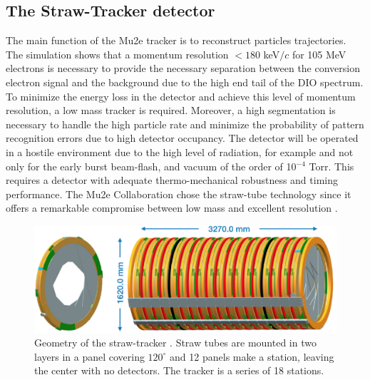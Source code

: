 \documentclass[12pt,a4paper,openright, oneside, titlepage]{book} %
\begin{document}
\subsection{The Straw-Tracker detector}
The main function of the Mu2e tracker is to reconstruct particles trajectories. 
The simulation shows that a momentum resolution $<180$ keV$/c$ for 105 MeV electrons 
is necessary to provide the necessary separation between the conversion electron signal 
and the background due to the high end tail of the DIO spectrum. 
To minimize the energy loss in the detector and achieve this level of momentum resolution, 
a low mass tracker is required. Moreover, a high segmentation is necessary to 
handle the high particle rate and minimize the probability of pattern recognition errors
due to high detector occupancy.
The detector will be operated in a hostile environment due to the high level of radiation, 
for example and not only for the early burst beam-flash, and vacuum of the order of 10$^{-4}$ Torr.
This requires a detector with adequate thermo-mechanical robustness and timing performance.
The Mu2e Collaboration chose the straw-tube technology 
since it offers a remarkable compromise between low mass 
and excellent resolution \cite{Tracker:2016} \cite{Tracker:2018}.

\begin{figure}[h!]
\centering
\includegraphics[scale=0.5]{Tracker_2}
\caption{Geometry of the straw-tracker \cite{Manolis}. 
Straw tubes are mounted in two layers in a panel covering $120^\circ$ 
and 12 panels make a station, leaving the center with no detectors. The tracker is a series of 18 stations.}
\label{_tracker}
\end{figure}

\end{document}
